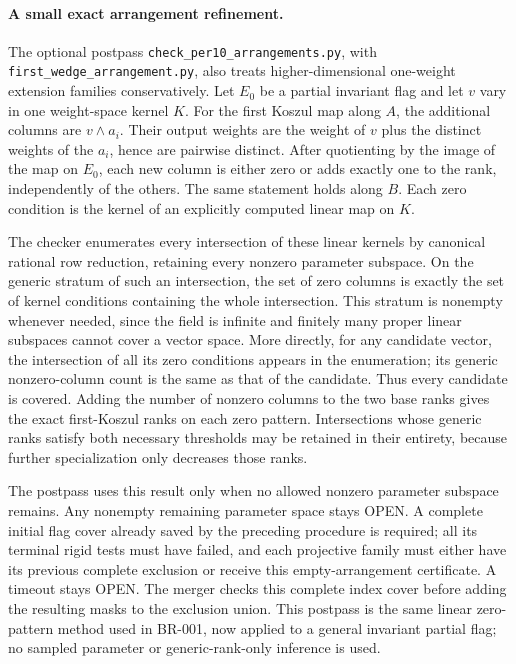 \paragraph{A small exact arrangement refinement.}
The optional postpass \texttt{check\_per10\_arrangements.py}, with
\texttt{first\_wedge\_arrangement.py}, also treats higher-dimensional
one-weight extension families conservatively.  Let $E_0$ be a partial
invariant flag and let $v$ vary in one weight-space kernel $K$.
For the first Koszul map along $A$, the additional columns are
$v\wedge a_i$.  Their output weights are the weight of $v$ plus the
distinct weights of the $a_i$, hence are pairwise distinct.  After
quotienting by the image of the map on $E_0$, each new column is either
zero or adds exactly one to the rank, independently of the others.
The same statement holds along $B$.  Each zero condition is the kernel
of an explicitly computed linear map on $K$.

The checker enumerates every intersection of these linear kernels by
canonical rational row reduction, retaining every nonzero parameter
subspace.  On the generic stratum of such an intersection, the set of
zero columns is exactly the set of kernel conditions containing the
whole intersection.  This stratum is nonempty whenever needed, since
the field is infinite and finitely many proper linear subspaces cannot
cover a vector space.  More directly, for any candidate vector, the
intersection of all its zero conditions appears in the enumeration;
its generic nonzero-column count is the same as that of the candidate.
Thus every candidate is covered.  Adding the number of nonzero
columns to the two base ranks gives the exact first-Koszul ranks on
each zero pattern.  Intersections whose generic ranks satisfy both
necessary thresholds may be retained in their entirety, because
further specialization only decreases those ranks.

The postpass uses this result only when no allowed nonzero parameter
subspace remains.  Any nonempty remaining parameter space stays OPEN.
A complete initial flag cover already saved by the preceding procedure
is required; all its terminal rigid tests must have failed, and each
projective family must either have its previous complete exclusion or
receive this empty-arrangement certificate.  A timeout stays OPEN.
The merger checks this complete index cover before adding the resulting
masks to the exclusion union.  This postpass is the same linear
zero-pattern method used in BR-001, now applied to a general invariant
partial flag; no sampled parameter or generic-rank-only inference is
used.
